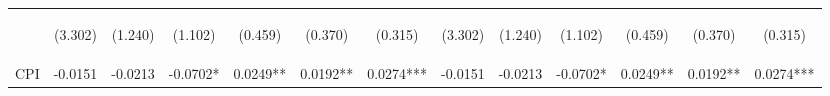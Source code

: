 \documentclass[]{article}
\begin{document}
\begin{center}
\begin{tabular}{lcccccccccccc}
\vspace{4pt} & \begin{footnotesize}(3.302)\end{footnotesize} & \begin{footnotesize}(1.240)\end{footnotesize} & \begin{footnotesize}(1.102)\end{footnotesize} & \begin{footnotesize}(0.459)\end{footnotesize} & \begin{footnotesize}(0.370)\end{footnotesize} & \begin{footnotesize}(0.315)\end{footnotesize} & \begin{footnotesize}(3.302)\end{footnotesize} & \begin{footnotesize}(1.240)\end{footnotesize} & \begin{footnotesize}(1.102)\end{footnotesize} & \begin{footnotesize}(0.459)\end{footnotesize} & \begin{footnotesize}(0.370)\end{footnotesize} & \begin{footnotesize}(0.315)\end{footnotesize} \\
CPI & -0.0151 & -0.0213 & -0.0702* & 0.0249** & 0.0192** & 0.0274*** & -0.0151 & -0.0213 & -0.0702* & 0.0249** & 0.0192** & 0.0274*** \\

\end{tabular}
\end{center}
\end{document}
